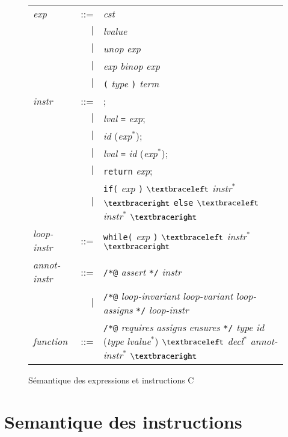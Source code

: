 \begin{figure}[tb]
  \begin{tabular}{lrl}
    \textit{exp} & ::= & \textit{cst} \\
    & $\mid$ & \textit{lvalue} \\
    & $\mid$ & \textit{unop} \textit{exp} \\
    & $\mid$ & \textit{exp} \textit{binop} \textit{exp} \\
    & $\mid$ & \lstinline'(' \textit{type} \lstinline')' \textit{term} \\
    \textit{instr} & ::= & ; \\
    & $\mid$ & \textit{lval} \lstinline'=' \textit{exp}; \\
    & $\mid$ & \textit{id} (\textit{exp}$^{*}$); \\
    & $\mid$ & \textit{lval} \lstinline'=' \textit{id} (\textit{exp}$^{*}$); \\
    & $\mid$ & \lstinline'return' \textit{exp}; \\
    & $\mid$ & \lstinline'if(' \textit{exp} \lstinline')'
    $\bopen$ \textit{instr}$^*$ $\bclose$
    \lstinline'else' $\bopen$ \textit{instr}$^*$ $\bclose$ \\
    \textit{loop-instr} & ::= & \lstinline'while(' \textit{exp} \lstinline')'
    $\bopen$ \textit{instr}$^*$ $\bclose$ \\
    \textit{annot-instr} & ::= & \lstinline'/*@' \textit{assert} \lstinline'*/'
    \textit{instr} \\
    & $\mid$ & \lstinline'/*@' \textit{loop-invariant} \textit{loop-variant}
    \textit{loop-assigns} \lstinline'*/' \textit{loop-instr} \\
    \textit{function} & ::= & \lstinline'/*@' \textit{requires} \textit{assigns}
    \textit{ensures} \lstinline'*/' \textit{type} \textit{id}
    (\textit{type} \textit{lvalue}$^{*}$)
    $\bopen$ \textit{decl}$^{*}$ \textit{annot-instr}$^{*}$
    $\bclose$
  \end{tabular}
  \label{fig:sem-c}
  \caption{Sémantique des expressions et instructions C}
\end{figure}



\section{Semantique des instructions}
\label{sec:semantics}


